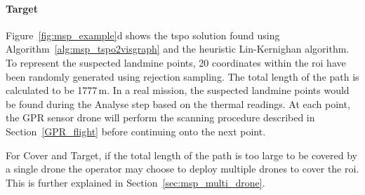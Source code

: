 \paragraph{Target} Figure~\ref{fig:msp_example}d shows the \gls{tspo} solution found using Algorithm~\ref{alg:msp_tspo2visgraph} and the heuristic Lin-Kernighan algorithm. To represent the suspected landmine points, 20 coordinates within the \gls{roi} have been randomly generated using rejection sampling. The total length of the path is calculated to be 1777\,m. In a real mission, the suspected landmine points would be found during the Analyse step based on the thermal readings. At each point, the \gls{GPR} sensor drone will perform the scanning procedure described in Section~\ref{GPR_flight} before continuing onto the next point. 

For Cover and Target, if the total length of the path is too large to be covered by a single drone the operator may choose to deploy multiple drones to cover the \gls{roi}. This is further explained in Section~\ref{sec:msp_multi_drone}. 

